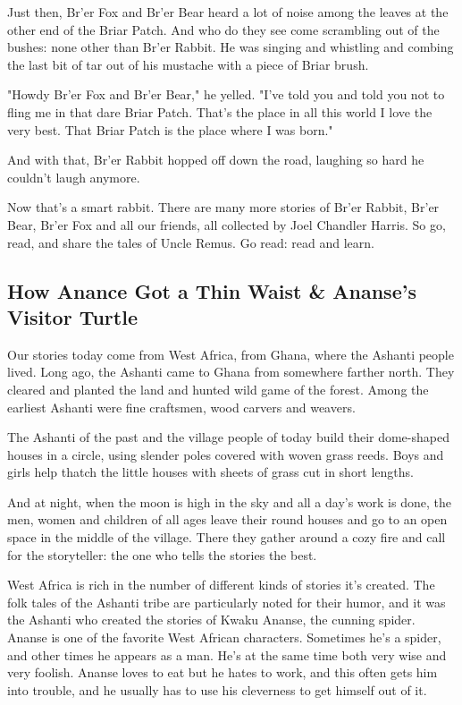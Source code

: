Just then, Br'er Fox and Br'er Bear heard a lot of noise among the leaves at the other end of the Briar Patch. And who do they see come scrambling out of the bushes: none other than Br'er Rabbit. He was singing and whistling and combing the last bit of tar out of his mustache with a piece of Briar brush.

"Howdy Br'er Fox and Br'er Bear," he yelled. "I've told you and told you not to fling me in that dare Briar Patch. That's the place in all this world I love the very best. That Briar Patch is the place where I was born."

And with that, Br'er Rabbit hopped off down the road, laughing so hard he couldn't laugh anymore.

Now that's a smart rabbit. There are many more stories of Br'er Rabbit, Br'er Bear, Br'er Fox and all our friends, all collected by Joel Chandler Harris. So go, read, and share the tales of Uncle Remus. Go read: read and learn.

\subsection{How Anance Got a Thin Waist \& Ananse's Visitor Turtle}

Our stories today come from West Africa, from Ghana, where the Ashanti people lived. Long ago, the Ashanti came to Ghana from somewhere farther north. They cleared and planted the land and hunted wild game of the forest. Among the earliest Ashanti were fine craftsmen, wood carvers and weavers.

The Ashanti of the past and the village people of today build their dome-shaped houses in a circle, using slender poles covered with woven grass reeds. Boys and girls help thatch the little houses with sheets of grass cut in short lengths.

And at night, when the moon is high in the sky and all a day's work is done, the men, women and children of all ages leave their round houses and go to an open space in the middle of the village. There they gather around a cozy fire and call for the storyteller: the one who tells the stories the best.

West Africa is rich in the number of different kinds of stories it's created. The folk tales of the Ashanti tribe are particularly noted for their humor, and it was the Ashanti who created the stories of Kwaku Ananse, the cunning spider. Ananse is one of the favorite West African characters. Sometimes he's a spider, and other times he appears as a man. He's at the same time both very wise and very foolish. Ananse loves to eat but he hates to work, and this often gets him into trouble, and he usually has to use his cleverness to get himself out of it.

